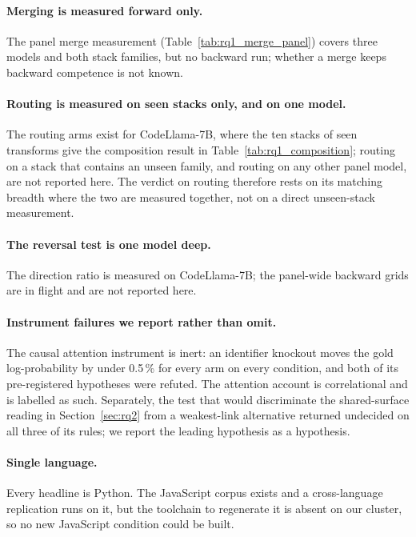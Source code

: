 \paragraph{Merging is measured forward only.} The panel merge measurement (Table~\ref{tab:rq1_merge_panel}) covers three models and both stack families, but no backward run; whether a merge keeps backward competence is not known.

\paragraph{Routing is measured on seen stacks only, and on one model.} The routing arms exist for CodeLlama-7B, where the ten stacks of seen transforms give the composition result in Table~\ref{tab:rq1_composition}; routing on a stack that contains an unseen family, and routing on any other panel model, are not reported here. The verdict on routing therefore rests on its matching breadth where the two are measured together, not on a direct unseen-stack measurement.

\paragraph{The reversal test is one model deep.} The direction ratio is measured on CodeLlama-7B;
the panel-wide backward grids are in flight and are not reported here.

\paragraph{Instrument failures we report rather than omit.} The causal attention instrument is
inert: an identifier knockout moves the gold log-probability by under 0.5\,\% for every arm on every
condition, and both of its pre-registered hypotheses were refuted. The attention account is
correlational and is labelled as such. Separately, the test that would discriminate the
shared-surface reading in Section~\ref{sec:rq2} from a weakest-link alternative returned undecided
on all three of its rules; we report the leading hypothesis as a hypothesis.

\paragraph{Single language.} Every headline is Python. The JavaScript corpus exists and a
cross-language replication runs on it, but the toolchain to regenerate it is absent on our cluster,
so no new JavaScript condition could be built.
